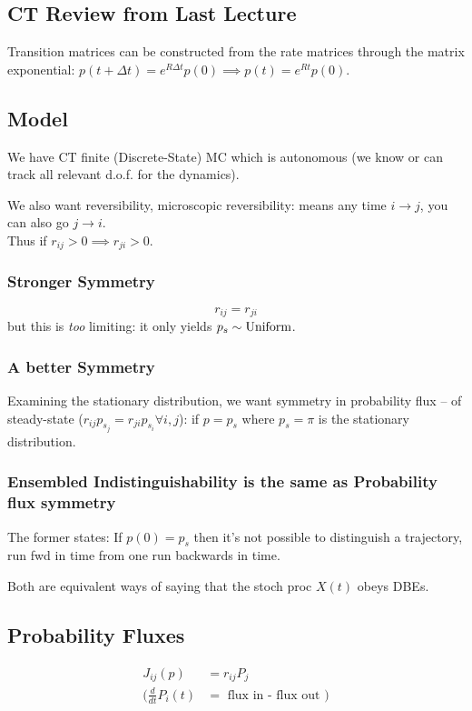 \subsection{CT Review from Last Lecture}
Transition matrices can be constructed from the rate matrices through the matrix exponential: $p(t+\Delta t)=e^{R\Delta t}p(0)\implies p(t)=e^{Rt}p(0)$.

\subsection{Model}
We have CT finite (Discrete-State) MC which is autonomous (we know or can track all relevant d.o.f. for the dynamics).

We also want reversibility, microscopic reversibility: means any time $i\to j$, you can also go $j\to i$.\\
Thus if $r_{ij}>0\implies r_{ji}>0$.

\subsubsection{Stronger Symmetry}
\begin{important}
\begin{equation}
    r_{ij} = r_{ji}
\end{equation}
but this is \textit{too} limiting: it only yields $p_s\sim\text{Uniform}$.
\end{important}

\subsubsection{A better Symmetry}
Examining the stationary distribution, we want symmetry in probability flux -- of steady-state ($r_{i j} p_{{s}_{j}} = r_{j i} p_{s_i} \forall{i, j}$): if $p=p_s$ where $p_s=\pi$ is the stationary distribution.

\subsubsection{Ensembled Indistinguishability is the same as Probability flux symmetry}
The former states: If $p(0)=p_s$ then it's not possible to distinguish a trajectory, run fwd in time from one run backwards in time.

Both are equivalent ways of saying that the stoch proc $X(t)$ obeys DBEs.

\subsection{Probability Fluxes}
\begin{align}
J_{ij}(p) & =r_{i j} P_j \\
\Big(\frac{d}{d t} P_i(t) & =\text { flux in - flux out }\Big)
\end{align}

